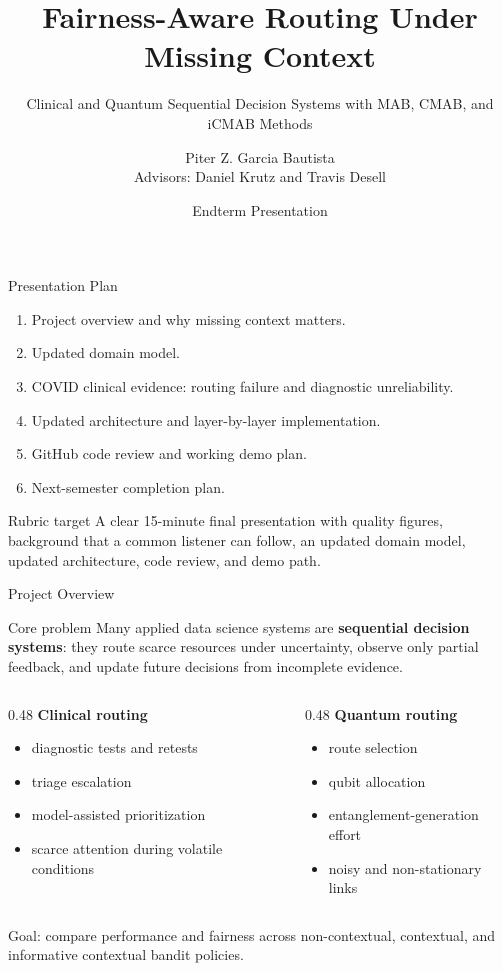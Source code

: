 \documentclass[aspectratio=169,10pt]{beamer}
\title[Fairness-Aware Routing]{Fairness-Aware Routing Under Missing Context}
\subtitle{Clinical and Quantum Sequential Decision Systems with MAB, CMAB, and iCMAB Methods}
\author[P. Z. Garcia Bautista]{Piter Z. Garcia Bautista\\Advisors: Daniel Krutz and Travis Desell}
\institute[RIT]{Rochester Institute of Technology\\DSCI 601 -- Applied Data Science I}
\date{Endterm Presentation}
\begin{document}
\begin{frame}
  \titlepage
\end{frame}

\begin{frame}{Presentation Plan}
\begin{enumerate}
    \item Project overview and why missing context matters.
    \item Updated domain model.
    \item COVID clinical evidence: routing failure and diagnostic unreliability.
    \item Updated architecture and layer-by-layer implementation.
    \item GitHub code review and working demo plan.
    \item Next-semester completion plan.
\end{enumerate}
\begin{block}{Rubric target}
A clear 15-minute final presentation with quality figures, background that a common listener can follow, an updated domain model, updated architecture, code review, and demo path.
\end{block}
\end{frame}

\begin{frame}{Project Overview}
\begin{block}{Core problem}
Many applied data science systems are \textbf{sequential decision systems}: they route scarce resources under uncertainty, observe only partial feedback, and update future decisions from incomplete evidence.
\end{block}
\begin{columns}[T]
\begin{column}{0.48\textwidth}
\textbf{Clinical routing}
\begin{itemize}
    \item diagnostic tests and retests
    \item triage escalation
    \item model-assisted prioritization
    \item scarce attention during volatile conditions
\end{itemize}
\end{column}
\begin{column}{0.48\textwidth}
\textbf{Quantum routing}
\begin{itemize}
    \item route selection
    \item qubit allocation
    \item entanglement-generation effort
    \item noisy and non-stationary links
\end{itemize}
\end{column}
\end{columns}
\vspace{0.4em}
\alert{Goal:} compare performance and fairness across non-contextual, contextual, and informative contextual bandit policies.
\end{frame}
\end{document}
